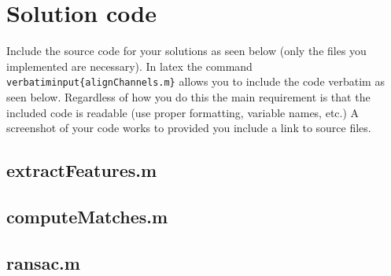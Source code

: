 \documentclass[10pt,letterpaper]{article}
\newcommand{\cmd}[1] {{\color{blue}\texttt{#1}}}
\begin{document}
\section{Solution code}
Include the source code for your solutions as seen below (only the files you implemented are necessary). 
In latex the command \cmd{verbatiminput\{alignChannels.m\}} allows you to include the code verbatim as seen below. 
Regardless of how you do this the main requirement is that the included code is readable (use proper formatting, variable names, etc.)
A screenshot of your code works to provided you include a link to source files.



\subsection{extractFeatures.m}

\subsection{computeMatches.m}

\subsection{ransac.m}

\end{document}
